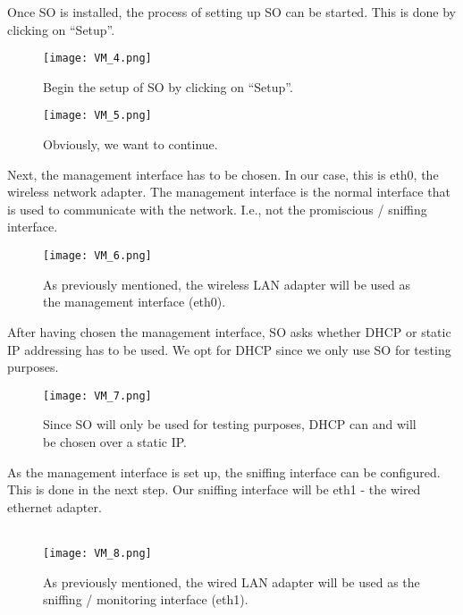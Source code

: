 Once SO is installed, the process of setting up SO can be started. This is done by clicking on ``Setup''.
\begin{figure}[h]
    \centering
    \texttt{[image: VM\_4.png]}
    \caption{Begin the setup of SO by clicking on ``Setup''.}
\end{figure}

\begin{figure}[h]
    \centering
    \texttt{[image: VM\_5.png]}
    \caption{Obviously, we want to continue.}
\end{figure}
\clearpage
Next, the management interface has to be chosen. In our case, this is eth0, the wireless network adapter. The management interface is the normal interface that is used to communicate with the network. I.e., not the promiscious / sniffing interface.
\begin{figure}[h]
    \centering
    \texttt{[image: VM\_6.png]}
    \caption{As previously mentioned, the wireless LAN adapter will be used as the management interface (eth0).}
\end{figure}

After having chosen the management interface, SO asks whether DHCP or static IP addressing has to be used. We opt for DHCP since we only use SO for testing purposes.
\begin{figure}[h]
    \centering
    \texttt{[image: VM\_7.png]}
    \caption{Since SO will only be used for testing purposes, DHCP can and will be chosen over a static IP.}
\end{figure}
\clearpage
As the management interface is set up, the sniffing interface can be configured. This is done in the next step. Our sniffing interface will be eth1 - the wired ethernet adapter. \\ \\
\begin{figure}[h]
    \centering
    \texttt{[image: VM\_8.png]}
    \caption{As previously mentioned, the wired LAN adapter will be used as the sniffing / monitoring interface (eth1).}
\end{figure}

